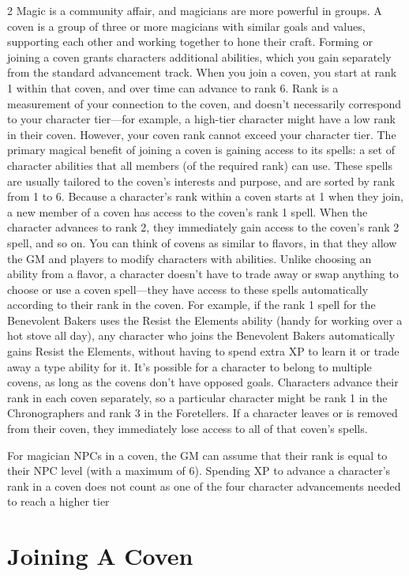 \begin{multicols}{2}
Magic is a community affair, and magicians are more powerful in groups. A coven is a group of three or more magicians with similar goals and values, supporting each other and working together to hone their craft. Forming or joining a coven grants characters additional abilities, which you gain separately from the standard advancement track. When you join a coven, you start at rank 1 within that coven, and over time can advance to rank 6. Rank is a measurement of your connection to the coven, and doesn’t necessarily correspond to your character tier—for example, a high-tier character might have a low rank in their coven. However, your coven rank cannot exceed your character tier. The primary magical benefit of joining a coven is gaining access to its spells: a set of character abilities that all members (of the required rank) can use. These spells are usually tailored to the coven’s interests and purpose, and are sorted by rank from 1 to 6. Because a character’s rank within a coven starts at 1 when they join, a new member of a coven has access to the coven’s rank 1 spell. When the character advances to rank 2, they immediately gain access to the coven’s rank 2 spell, and so on. You can think of covens as similar to flavors, in that they allow the GM and players to modify characters with abilities. Unlike choosing an ability from a flavor, a character doesn’t have to trade away or swap anything to choose or use a coven spell—they have access to these spells automatically according to their rank in the coven. For example, if the rank 1 spell for the Benevolent Bakers uses the Resist the Elements ability (handy for working over a hot stove all day), any character who joins the Benevolent Bakers automatically gains Resist the Elements, without having to spend extra XP to learn it or trade away a type ability for it. It’s possible for a character to belong to multiple covens, as long as the covens don’t have opposed goals. Characters advance their rank in each coven separately, so a particular character might be rank 1 in the Chronographers and rank 3 in the Foretellers. If a character leaves or is removed from their coven, they immediately lose access to all of that coven’s spells.

For magician NPCs in a coven, the GM can assume that their rank is equal to their NPC level (with a maximum of 6).
Spending XP to advance a character’s rank in a coven does not count as one of the four character advancements needed to reach a higher tier

\section{Joining A Coven}


\end{multicols}
